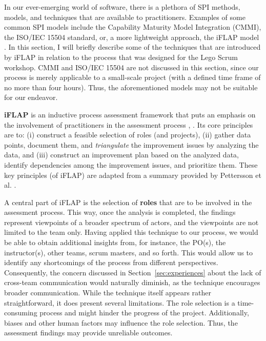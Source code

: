 \documentclass[conference]{IEEEtran}
\begin{document}
In our ever-emerging world of software, there is a plethora of SPI methods,
models, and techniques that are available to practitioners. Examples of some
common SPI models include the Capability Maturity Model Integration (CMMI), the
ISO/IEC 15504 standard, or, a more lightweight approach, the iFLAP model
\cite{Pettersson2008}. In this section, I will briefly describe some of the
techniques that are introduced by iFLAP in relation to the process that was
designed for the Lego Scrum workshop. CMMI and ISO/IEC 15504 are not discussed
in this section, since our process is merely applicable to a small-scale
project (with a defined time frame of no more than four hours). Thus, the
aforementioned models may not be suitable for our endeavor.

\textbf{{\selectfont iFLAP}} is an inductive process assessment
framework that puts an emphasis on the involvement of practitioners in the
assessment process \cite{Pettersson2008}, \cite{Malvius2009}. Its core
principles are to: (i) construct a feasible selection of roles (and projects),
(ii) gather data points, document them, and \textit{triangulate} the
improvement issues by analyzing the data, and (iii) construct an improvement
plan based on the analyzed data, identify dependencies among the improvement
issues, and prioritize them. These key principles (of iFLAP) are adapted from a
summary provided by Pettersson et al. \cite{Pettersson2008}.

A central part of iFLAP is the selection of \textbf{roles} that are to be
involved in the assessment process. This way, once the analysis is completed,
the findings represent viewpoints of a broader spectrum of actors, and the
viewpoints are not limited to the team only. Having applied this technique to
our process, we would be able to obtain additional insights from, for instance,
the PO(s), the instructor(s), other teams, scrum masters, and so forth. This
would allow us to identify any shortcomings of the process from different
perspectives. Consequently, the concern discussed in
Section~\ref{sec:experiences} about the lack of cross-team communication would
naturally diminish, as the technique encourages broader communication. While
the technique itself appears rather straightforward, it does present several
limitations. The role selection is a time-consuming process and might hinder
the progress of the project. Additionally, biases and other human factors may
influence the role selection. Thus, the assessment findings may provide
unreliable outcomes.
\end{document}
